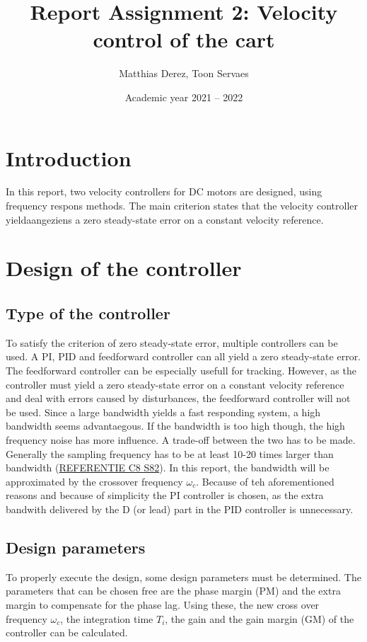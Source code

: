\documentclass[a4paper,kul]{kulakarticle} %
\date{Academic year 2021 -- 2022}
\title{Report Assignment 2: Velocity control of the cart}
\author{Matthias Derez, Toon Servaes}
\begin{document}
\maketitle
\section{Introduction}
In this report, two velocity controllers for DC motors are designed, using frequency respons methods. The main criterion states that the velocity controller yieldaangeziens a zero steady-state error on a constant velocity reference. 
\section{Design of the controller}
\subsection{Type of the controller}
To satisfy the criterion of zero steady-state error, multiple controllers can be used. A PI, PID and feedforward controller can all yield a zero steady-state error. The feedforward controller can be especially usefull for tracking. However, as the controller must yield a zero steady-state error on a constant velocity reference and deal with errors caused by disturbances, the feedforward controller will not be used. Since a large bandwidth yields a fast responding system, a high bandwidth seems advantaegous. If the bandwidth is too high though, the high frequency noise has more influence. A trade-off between the two has to be made. Generally the sampling frequency has to be at least 10-20 times larger than bandwidth (\underline{REFERENTIE C8 S82}). In this report, the bandwidth will be approximated by the crossover frequency $\omega_c$. Because of teh aforementioned reasons and because of simplicity the PI controller is chosen, as the extra bandwith delivered by the D (or lead) part in the PID controller is unnecessary.  
\subsection{Design parameters}
To properly execute the design, some design parameters must be determined. The parameters that can be chosen free are the phase margin (PM) and the extra margin to compensate for the phase lag. Using these, the new cross over frequency $\omega_c$, the integration time $T_i$, the gain and the gain margin (GM) of the controller can be calculated. 
\end{document}
